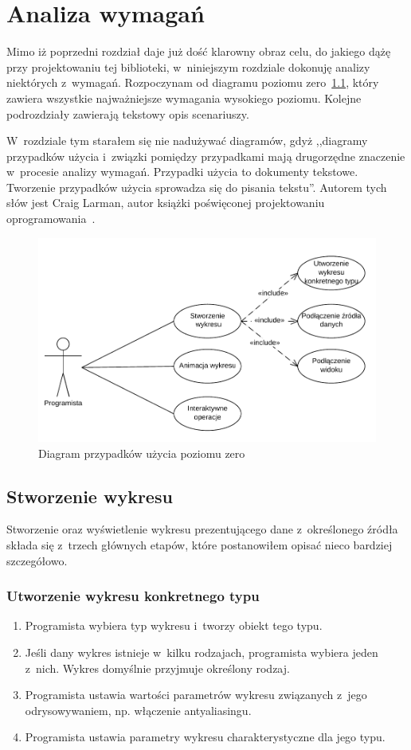 \chapter{Analiza wymagań}
Mimo iż poprzedni rozdział daje już dość klarowny obraz celu, do jakiego dążę przy projektowaniu tej biblioteki, w~niniejszym rozdziale dokonuję analizy niektórych z~wymagań. Rozpoczynam od diagramu poziomu zero~\ref{rys:use:cases}, który zawiera wszystkie najważniejsze wymagania wysokiego poziomu. Kolejne podrozdziały zawierają tekstowy opis scenariuszy. 

W~rozdziale tym starałem się nie nadużywać diagramów, gdyż ,,diagramy przypadków użycia i~związki pomiędzy przypadkami mają drugorzędne znaczenie w~procesie analizy wymagań. Przypadki użycia to dokumenty tekstowe. Tworzenie przypadków użycia sprowadza się do pisania tekstu''. Autorem tych słów jest Craig Larman, autor książki poświęconej projektowaniu oprogramowania~\cite{UML:Wzorce}.

\begin{figure}[H]
\centering
\includegraphics[scale=0.9]{img/use_case.pdf}
\caption{Diagram przypadków użycia poziomu zero}\label{rys:use:cases}
\end{figure}

\section{Stworzenie wykresu}
Stworzenie oraz wyświetlenie wykresu prezentującego dane z~określonego źródła składa się z~trzech głównych etapów, które postanowiłem opisać nieco bardziej szczegółowo.

\subsection{Utworzenie wykresu konkretnego typu}
\begin{enumerate}
\item{Programista wybiera typ wykresu i~tworzy obiekt tego typu.}
\item{Jeśli dany wykres istnieje w~kilku rodzajach, programista wybiera jeden z~nich. Wykres domyślnie przyjmuje określony rodzaj.}
\item{Programista ustawia wartości parametrów wykresu związanych z~jego odrysowywaniem, np. włączenie antyaliasingu.}
\item{Programista ustawia parametry wykresu charakterystyczne dla jego typu.}
\end{enumerate}

